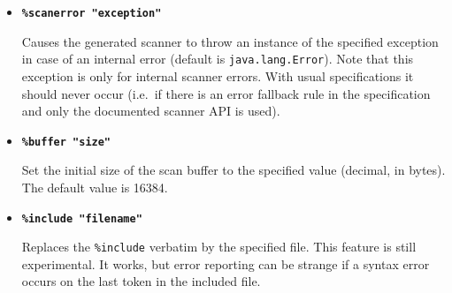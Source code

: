\documentclass[11pt]{scrartcl}
\begin{document}
\begin{itemize}
\item 
{\bf \texttt{\%scanerror "exception"}}

Causes the generated scanner to throw an instance of the specified
exception in case of an internal error (default is
\texttt{java.lang.Error}).  Note that this exception is only for
internal scanner errors. With usual specifications it should never
occur (i.e.~if there is an error fallback rule in the specification
and only the documented scanner API is used).

\item
{\bf \texttt{\%buffer "size"}}

Set the initial size of the scan buffer to the specified value 
(decimal, in bytes). The default value is 16384.

\item 
{\bf \texttt{\%include "filename"}}

Replaces the \texttt{\%include} verbatim by the specified file. This
feature is still experimental. It works, but error reporting can be
strange if a syntax error occurs on the last token in the included
file.

\end{itemize}
\end{document}
